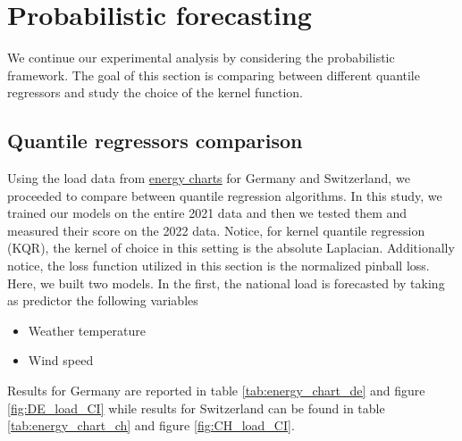 \section{Probabilistic forecasting}
We continue our experimental analysis by considering the probabilistic framework. The goal of this section is comparing between different quantile regressors and study the choice of the kernel function.

\subsection{Quantile regressors comparison}
Using the load data from \href{https://www.energy-charts.info/index.html?l=en&c=DE}{energy charts} for Germany and Switzerland, we proceeded to compare between quantile regression algorithms. In this study, we trained our models on the entire 2021 data and then we tested them and measured their score on the 2022 data.
Notice, for kernel quantile regression (KQR), the kernel of choice in this setting is the absolute Laplacian. Additionally notice, the loss function utilized in this section is the normalized pinball loss. 
Here, we built two models. In the first, the national load is forecasted by taking as predictor the following variables
\begin{itemize}
    \item Weather temperature
    \item Wind speed
\end{itemize}
Results for Germany are reported in table \ref{tab:energy_chart_de} and figure \ref{fig:DE_load_CI} while results for Switzerland can be found in table \ref{tab:energy_chart_ch} and figure \ref{fig:CH_load_CI}.

